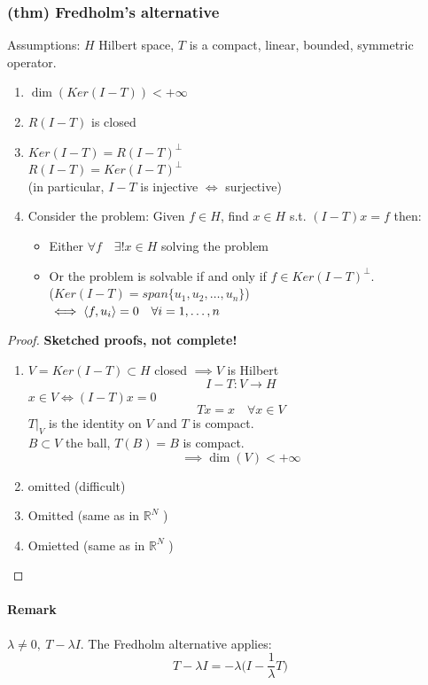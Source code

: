 \subsubsection{(thm) Fredholm's alternative}
Assumptions: $H$ Hilbert space, $T$ is a compact, linear, bounded, symmetric operator.
\begin{enumerate}
    \item $\dim( Ker(I-T))<+\infty$
    \item $R(I-T)$ is closed
    \item $Ker(I-T)=R(I-T)^\perp$\\
    $R(I-T)=Ker(I-T)^\perp$\\
    (in particular, $I-T$ is injective $\iff$ surjective)
    \item Consider the problem: Given $f\in H$, find $x\in H$ s.t. $(I-T)x=f$ then:
    \begin{itemize}
        \item Either $\forall f\quad \exists !x\in H$ solving the problem
        \item Or the problem is solvable if and only if $f\in Ker(I-T)^\perp$.\\
        ($Ker(I-T)=span\{ u_1,u_2,\dots, u_n\}$)\\
        $\iff\langle {f} , {u_i} \rangle=0\quad \forall i =1,\dots, n$
        
    \end{itemize}
\end{enumerate}
\begin{proof} \textbf{Sketched proofs, not complete!}\\
\begin{enumerate}
    \item $V=Ker(I-T)\subset H$ closed $\implies V$ is Hilbert
    $$I-T:V\to H$$
    $x\in V\iff (I-T)x=0$
    $$Tx=x\quad \forall x\in V$$
    $T|_V$ is the identity on $V$ and $T$ is compact.\\
    $B\subset V$ the ball, $T(B)=B$ is compact.
    $$\implies \dim(V)<+\infty$$
    \item omitted (difficult)
    \item Omitted (same as in $\mathbb R^N$ )
    \item Omietted (same as in $\mathbb R^N$ )
\end{enumerate}
    
\end{proof}
\paragraph{Remark}
$\lambda \neq 0, \ T-\lambda I$. The Fredholm alternative applies:
$$T-\lambda I=-\lambda\Big ( I-\frac 1\lambda T\Big )$$
